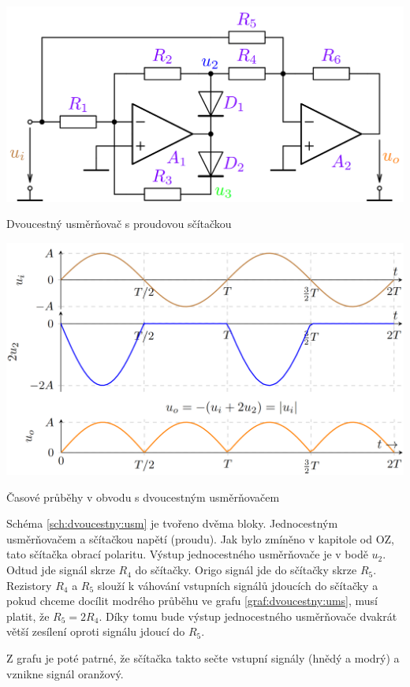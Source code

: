 \documentclass[a4paper,12pt]{article}   %
\begin{document}
\begin{schema}[h!]
    \centering
    \includegraphics[width=.6\textwidth]{dvoucestny_usmernovac.PNG}
    \caption{Dvoucestný usměrňovač s proudovou sčítačkou}
    \label{sch:dvoucestny:usm}
\end{schema}

\begin{graf}[h!]
    \centering
    \includegraphics[width=.7\textwidth]{dvoucestny_usmernovac-prubeh.PNG}
    \caption{Časové průběhy v obvodu s dvoucestným usměrňovačem}
    \label{graf:dvoucestny:ums}
\end{graf}

Schéma \ref{sch:dvoucestny:usm} je tvořeno dvěma bloky. Jednocestným usměrňovačem a sčítačkou napětí (proudu). Jak bylo zmíněno v kapitole od OZ, tato sčítačka obrací polaritu. Výstup jednocestného usměrňovače je v bodě $u_2$. Odtud jde signál skrze $R_4$ do sčítačky. Origo signál jde do sčítačky skrze $R_5$. Rezistory $R_4$ a $R_5$ slouží k váhování vstupních signálů jdoucích do sčítačky a pokud chceme docílit modrého průběhu ve grafu \ref{graf:dvoucestny:ums}, musí platit, že $R_5 = 2R_4$. Díky tomu bude výstup jednocestného usměrňovače dvakrát větší zesílení oproti signálu jdoucí do $R_5$.

Z grafu je poté patrné, že sčítačka takto sečte vstupní signály (hnědý a modrý) a vznikne signál oranžový.





\end{document}
